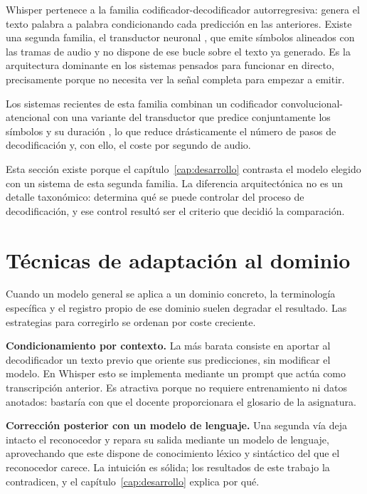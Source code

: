 Whisper pertenece a la familia codificador-decodificador autorregresiva: genera el texto
palabra a palabra condicionando cada predicción en las anteriores. Existe una segunda
familia, el transductor neuronal \cite{graves2012transducer}, que emite símbolos alineados
con las tramas de audio y no dispone de ese bucle sobre el texto ya generado. Es la
arquitectura dominante en los sistemas pensados para funcionar en directo, precisamente
porque no necesita ver la señal completa para empezar a emitir.

Los sistemas recientes de esta familia combinan un codificador convolucional-atencional
\cite{gulati2020conformer, rekesh2023fastconformer} con una variante del transductor que
predice conjuntamente los símbolos y su duración \cite{xu2023tdt}, lo que reduce
drásticamente el número de pasos de decodificación y, con ello, el coste por segundo de
audio.

Esta sección existe porque el capítulo~\ref{cap:desarrollo} contrasta el modelo elegido con
un sistema de esta segunda familia. La diferencia arquitectónica no es un detalle
taxonómico: determina qué se puede controlar del proceso de decodificación, y ese control
resultó ser el criterio que decidió la comparación.

\section{Técnicas de adaptación al dominio}

Cuando un modelo general se aplica a un dominio concreto, la terminología específica y el
registro propio de ese dominio suelen degradar el resultado. Las estrategias para
corregirlo se ordenan por coste creciente.

\textbf{Condicionamiento por contexto.} La más barata consiste en aportar al decodificador
un texto previo que oriente sus predicciones, sin modificar el modelo. En Whisper esto se
implementa mediante un prompt que actúa como transcripción anterior. Es atractiva porque
no requiere entrenamiento ni datos anotados: bastaría con que el docente proporcionara el
glosario de la asignatura.

\textbf{Corrección posterior con un modelo de lenguaje.} Una segunda vía deja intacto el
reconocedor y repara su salida mediante un modelo de lenguaje, aprovechando que este
dispone de conocimiento léxico y sintáctico del que el reconocedor carece. La intuición es
sólida; los resultados de este trabajo la contradicen, y el capítulo~\ref{cap:desarrollo}
explica por qué.

